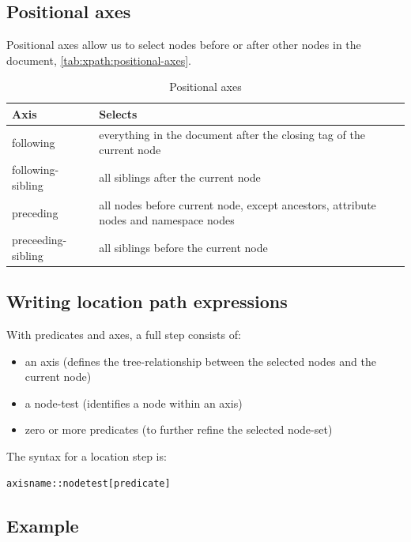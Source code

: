 \documentclass{pgnotes}
\begin{document}
\subsection{Positional axes} 

Positional axes allow us to select nodes before or after other nodes in the document, \autoref{tab:xpath:positional-axes}. 

\begin{table}[htbp]
  \begin{tabularx}{1.0\linewidth}{l X}
    \toprule
    \textbf{Axis} & \textbf{Selects} \\
    \midrule
    following & everything in the document after the closing tag of the current node \\
    following-sibling & all siblings after the current node \\
    preceding &  all nodes  before  current node, except ancestors, attribute nodes and namespace nodes \\
    preceeding-sibling & all siblings before the current node \\
    \bottomrule
  \end{tabularx}
  \caption{Positional axes}
  \label{tab:xpath:positional-axes}
\end{table}

\subsection{Writing location path expressions}

With predicates and axes, a full step consists of:

\begin{itemize}
\item an axis (defines the tree-relationship between the selected nodes and the current node)
\item a node-test (identifies a node within an axis)
\item zero or more predicates (to further refine the selected node-set)
\end{itemize}

The syntax for a location step is:
\begin{verbatim}
axisname::nodetest[predicate]
\end{verbatim}


\subsection{Example}
\end{document}
